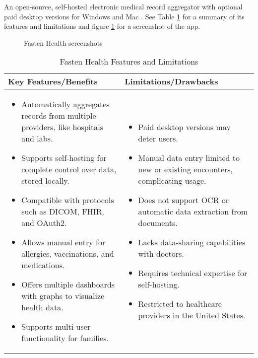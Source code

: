 An open-source, self-hosted electronic medical record aggregator with optional paid desktop versions for Windows and Mac \parencite{fasten}. See Table \ref{tab:fasten_health} for a summary of its features and limitations and figure \ref{fig:fasten} for a screenshot of the app.

\begin{figure}[ht]
    \centering
    \hspace{0.05\textwidth} 
    \caption{Fasten Health screenshots}
    \label{fig:fasten}
\end{figure}

\begin{table}[h!]
\centering
    \begin{tabular}{|p{}|p{}|}
    \hline
    \textbf{Key Features/Benefits} & \textbf{Limitations/Drawbacks} \\ \hline
    \begin{itemize}
        \item Automatically aggregates records from multiple providers, like hospitals and labs.
        \item Supports self-hosting for complete control over data, stored locally.
        \item Compatible with protocols such as DICOM, FHIR, and OAuth2.
        \item Allows manual entry for allergies, vaccinations, and medications.
        \item Offers multiple dashboards with graphs to visualize health data.
        \item Supports multi-user functionality for families.
    \end{itemize} &
    \begin{itemize}
        \item Paid desktop versions may deter users.
        \item Manual data entry limited to new or existing encounters, complicating usage.
        \item Does not support OCR or automatic data extraction from documents.
        \item Lacks data-sharing capabilities with doctors.
        \item Requires technical expertise for self-hosting.
        \item Restricted to healthcare providers in the United States.
    \end{itemize} \\ \hline
    \end{tabular}
\caption{Fasten Health Features and Limitations}
\label{tab:fasten_health}
\end{table}
